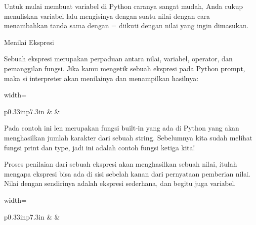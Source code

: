 \vspace{\baselineskip}
Untuk mulai membuat variabel di Python caranya sangat mudah, Anda cukup menuliskan variabel lalu mengisinya dengan suatu nilai dengan cara menambahkan tanda sama dengan $  $= $  $diikuti dengan nilai yang ingin dimasukan. \par
\vspace{12pt}
\noindent 
Menilai Ekspresi \par
\vspace{12pt}
\noindent 
Sebuah ekspresi merupakan perpaduan antara nilai, variabel, operator, dan pemanggilan fungsi. Jika kamu mengetik sebuah ekspresi pada Python prompt, maka si interpreter akan $  $menilainya $  $dan menampilkan hasilnya: \par
\vspace{12pt}




\begin{table}[H]
\centering
\begin{adjustbox}{width=\textwidth}
\begin{tabular}{ p{0.33in}p{7.3in} }
\hhline{--}
 &  & \hline
\end{tabular}
\end{adjustbox}
\end{table}




\vspace{12pt}
\noindent 
Pada contoh ini $  $len $  $merupakan fungsi built-in yang ada di Python yang akan menghasilkan jumlah karakter dari sebuah string. Sebelumnya kita sudah melihat fungsi $  $print $  $dan $  $type, jadi ini adalah contoh fungsi ketiga kita! \par
\vspace{12pt}
\noindent 
Proses $  $penilaian dari sebuah ekspresi $  $akan menghasilkan sebuah nilai, itulah mengapa ekspresi bisa ada di sisi sebelah kanan dari pernyataan pemberian nilai. $  $Nilai $  $dengan sendirinya $  $adalah ekspresi $  $sederhana, $  $dan begitu juga $  $variabel. \par
\vspace{12pt}




\begin{table}[H]
\centering
\begin{adjustbox}{width=\textwidth}
\begin{tabular}{ p{0.33in}p{7.3in} }
\hhline{--}
 &  & \hline
\end{tabular}
\end{adjustbox}
\end{table}


